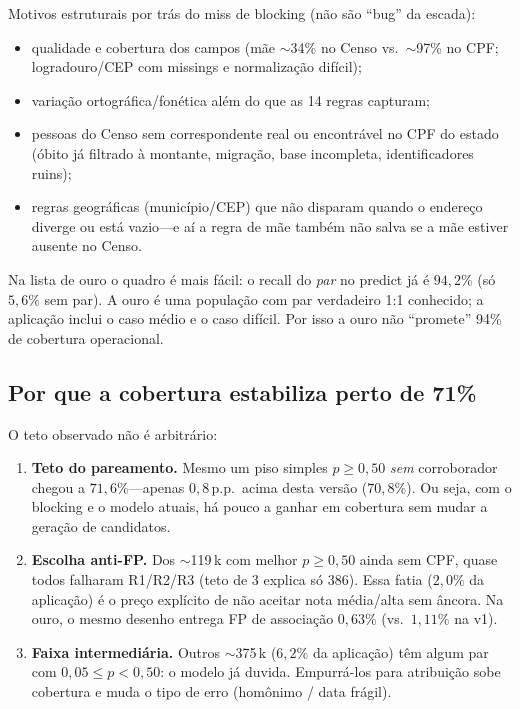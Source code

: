 \documentclass[11pt,a4paper]{article}
\begin{document}
Motivos estruturais por trás do miss de blocking (não são ``bug'' da escada):

\begin{itemize}
  \item qualidade e cobertura dos campos (mãe $\sim$34\% no Censo vs.\
        $\sim$97\% no CPF; logradouro/CEP com missings e normalização
        difícil);
  \item variação ortográfica/fonética além do que as 14 regras capturam;
  \item pessoas do Censo sem correspondente real ou encontrável no CPF do
        estado (óbito já filtrado à montante, migração, base incompleta,
        identificadores ruins);
  \item regras geográficas (município/CEP) que não disparam quando o endereço
        diverge ou está vazio---e aí a regra de mãe também não salva se a mãe
        estiver ausente no Censo.
\end{itemize}

Na lista de ouro o quadro é mais fácil: o recall do \emph{par} no predict já
é $94{,}2\%$ (só $5{,}6\%$ sem par). A ouro é uma população com par verdadeiro
1:1 conhecido; a aplicação inclui o caso médio e o caso difícil. Por isso a
ouro não ``promete'' 94\% de cobertura operacional.

\subsection{Por que a cobertura estabiliza perto de 71\%}

O teto observado não é arbitrário:

\begin{enumerate}
  \item \textbf{Teto do pareamento.}
    Mesmo um piso simples $p \ge 0{,}50$ \emph{sem} corroborador chegou a
    $71{,}6\%$---apenas $0{,}8$\,p.p.\ acima desta versão ($70{,}8\%$). Ou seja,
    com o blocking e o modelo atuais, há pouco a ganhar em cobertura sem
    mudar a geração de candidatos.
  \item \textbf{Escolha anti-FP.}
    Dos $\sim$119\,k com melhor $p \ge 0{,}50$ ainda sem CPF, quase todos
    falharam R1/R2/R3 (teto de 3 explica só 386). Essa fatia ($2{,}0\%$ da
    aplicação) é o preço explícito de não aceitar nota média/alta sem âncora.
    Na ouro, o mesmo desenho entrega FP de associação $0{,}63\%$ (vs.\
    $1{,}11\%$ na v1).
  \item \textbf{Faixa intermediária.}
    Outros $\sim$375\,k ($6{,}2\%$ da aplicação) têm algum par com
    $0{,}05 \le p < 0{,}50$: o modelo já duvida. Empurrá-los para atribuição
    sobe cobertura e muda o tipo de erro (homônimo / data frágil).
\end{enumerate}
\end{document}
